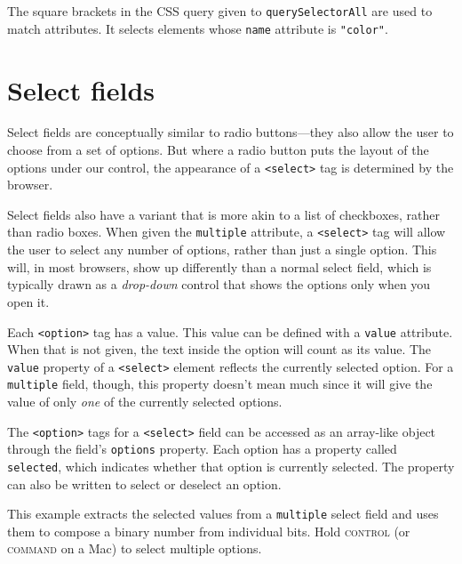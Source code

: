 The square brackets in the CSS query given to \lstinline`querySelectorAll` are used to match attributes. It selects elements whose \lstinline`name` attribute is \lstinline`"color"`.

\section{Select fields}

Select fields are conceptually similar to radio buttons—they also allow the user to choose from a set of options. But where a radio button puts the layout of the options under our control, the appearance of a \lstinline`<select>` tag is determined by the browser.

Select fields also have a variant that is more akin to a list of checkboxes, rather than radio boxes. When given the \lstinline`multiple` attribute, a \lstinline`<select>` tag will allow the user to select any number of options, rather than just a single option. This will, in most browsers, show up differently than a normal select field, which is typically drawn as a \emph{drop-down} control that shows the options only when you open it.

Each \lstinline`<option>` tag has a value. This value can be defined with a \lstinline`value` attribute. When that is not given, the text inside the option will count as its value. The \lstinline`value` property of a \lstinline`<select>` element reflects the currently selected option. For a \lstinline`multiple` field, though, this property doesn't mean much since it will give the value of only \emph{one} of the currently selected options.

The \lstinline`<option>` tags for a \lstinline`<select>` field can be accessed as an array-like object through the field's \lstinline`options` property. Each option has a property called \lstinline`selected`, which indicates whether that option is currently selected. The property can also be written to select or deselect an option.

This example extracts the selected values from a \lstinline`multiple` select field and uses them to compose a binary number from individual bits. Hold \textsc{control} (or \textsc{command} on a Mac) to select multiple options.

